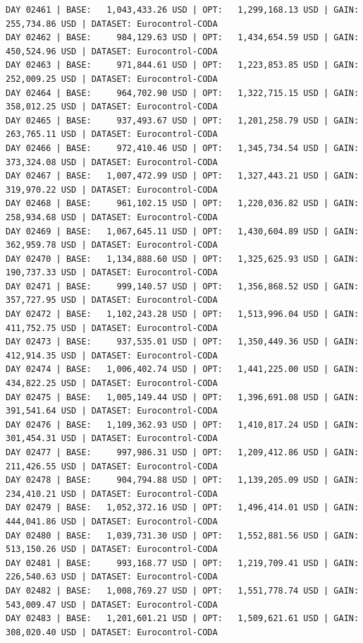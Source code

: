 \documentclass[11pt,a4paper]{article}
\begin{document}
\begin{verbatim}
DAY 02461 | BASE:   1,043,433.26 USD | OPT:   1,299,168.13 USD | GAIN: 255,734.86 USD | DATASET: Eurocontrol-CODA
DAY 02462 | BASE:     984,129.63 USD | OPT:   1,434,654.59 USD | GAIN: 450,524.96 USD | DATASET: Eurocontrol-CODA
DAY 02463 | BASE:     971,844.61 USD | OPT:   1,223,853.85 USD | GAIN: 252,009.25 USD | DATASET: Eurocontrol-CODA
DAY 02464 | BASE:     964,702.90 USD | OPT:   1,322,715.15 USD | GAIN: 358,012.25 USD | DATASET: Eurocontrol-CODA
DAY 02465 | BASE:     937,493.67 USD | OPT:   1,201,258.79 USD | GAIN: 263,765.11 USD | DATASET: Eurocontrol-CODA
DAY 02466 | BASE:     972,410.46 USD | OPT:   1,345,734.54 USD | GAIN: 373,324.08 USD | DATASET: Eurocontrol-CODA
DAY 02467 | BASE:   1,007,472.99 USD | OPT:   1,327,443.21 USD | GAIN: 319,970.22 USD | DATASET: Eurocontrol-CODA
DAY 02468 | BASE:     961,102.15 USD | OPT:   1,220,036.82 USD | GAIN: 258,934.68 USD | DATASET: Eurocontrol-CODA
DAY 02469 | BASE:   1,067,645.11 USD | OPT:   1,430,604.89 USD | GAIN: 362,959.78 USD | DATASET: Eurocontrol-CODA
DAY 02470 | BASE:   1,134,888.60 USD | OPT:   1,325,625.93 USD | GAIN: 190,737.33 USD | DATASET: Eurocontrol-CODA
DAY 02471 | BASE:     999,140.57 USD | OPT:   1,356,868.52 USD | GAIN: 357,727.95 USD | DATASET: Eurocontrol-CODA
DAY 02472 | BASE:   1,102,243.28 USD | OPT:   1,513,996.04 USD | GAIN: 411,752.75 USD | DATASET: Eurocontrol-CODA
DAY 02473 | BASE:     937,535.01 USD | OPT:   1,350,449.36 USD | GAIN: 412,914.35 USD | DATASET: Eurocontrol-CODA
DAY 02474 | BASE:   1,006,402.74 USD | OPT:   1,441,225.00 USD | GAIN: 434,822.25 USD | DATASET: Eurocontrol-CODA
DAY 02475 | BASE:   1,005,149.44 USD | OPT:   1,396,691.08 USD | GAIN: 391,541.64 USD | DATASET: Eurocontrol-CODA
DAY 02476 | BASE:   1,109,362.93 USD | OPT:   1,410,817.24 USD | GAIN: 301,454.31 USD | DATASET: Eurocontrol-CODA
DAY 02477 | BASE:     997,986.31 USD | OPT:   1,209,412.86 USD | GAIN: 211,426.55 USD | DATASET: Eurocontrol-CODA
DAY 02478 | BASE:     904,794.88 USD | OPT:   1,139,205.09 USD | GAIN: 234,410.21 USD | DATASET: Eurocontrol-CODA
DAY 02479 | BASE:   1,052,372.16 USD | OPT:   1,496,414.01 USD | GAIN: 444,041.86 USD | DATASET: Eurocontrol-CODA
DAY 02480 | BASE:   1,039,731.30 USD | OPT:   1,552,881.56 USD | GAIN: 513,150.26 USD | DATASET: Eurocontrol-CODA
DAY 02481 | BASE:     993,168.77 USD | OPT:   1,219,709.41 USD | GAIN: 226,540.63 USD | DATASET: Eurocontrol-CODA
DAY 02482 | BASE:   1,008,769.27 USD | OPT:   1,551,778.74 USD | GAIN: 543,009.47 USD | DATASET: Eurocontrol-CODA
DAY 02483 | BASE:   1,201,601.21 USD | OPT:   1,509,621.61 USD | GAIN: 308,020.40 USD | DATASET: Eurocontrol-CODA

\end{verbatim}
\end{document}
